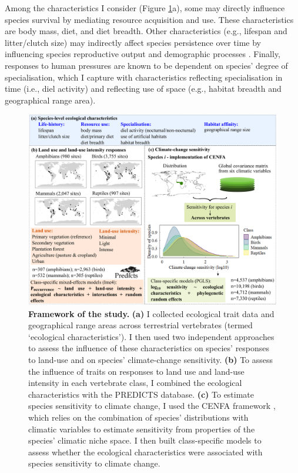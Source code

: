 Among the characteristics I consider (Figure \ref{chap4_fig1}a), some may directly influence species survival by mediating resource acquisition and use. These characteristics are body mass, diet, and diet breadth. Other characteristics (e.g., lifespan and litter/clutch size) may indirectly affect species persistence over time by influencing species reproductive output and demographic processes \citep{Capdevila2022a}. Finally, responses to human pressures are known to be dependent on species' degree of specialisation, which I capture with characteristics reflecting specialisation in time (i.e., diel activity) and reflecting use of space (e.g., habitat breadth and geographical range area). 


\clearpage

\begin{figure}
\centering
\includegraphics[scale=0.55]{figures/Chapter4/Figure1}
\caption[Framework of the study]{\textbf{Framework of the study.} \textbf{(a)} I collected ecological trait data and geographical range areas across terrestrial vertebrates (termed `ecological characteristics'). I then used two independent approaches to assess the influence of these characteristics on species' responses to land-use and on species' climate-change sensitivity. \textbf{(b)} To assess the influence of traits on responses to land use and land-use intensity in each vertebrate class, I combined the ecological characteristics with the PREDICTS database. \textbf{(c)} To estimate species sensitivity to climate change, I used the CENFA framework \citep{Rinnan2019}, which relies on the combination of species’ distributions with climatic variables to estimate sensitivity from properties of the species’ climatic niche space. I then built class-specific models to assess whether the ecological characteristics were associated with  species sensitivity to climate change.}
\label{chap4_fig1}
\end{figure}

